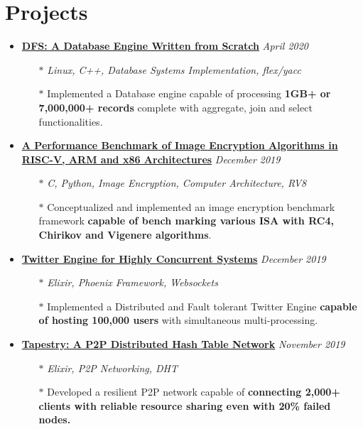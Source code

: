 \documentclass[10pt,a4paper]{article}
\begin{document}
\section{{\faCoffee} Projects}
	\begin{itemize}[noitemsep,nolistsep]

		\item{\textbf{\href{https://github.com/r0ck3r008/database-from-scratch}{DFS: A Database Engine Written from Scratch}} \hfill \textit{April 2020}}
			\begin{itemize}[leftmargin=*]
				\setlength\itemsep{-0.25em}
				\item[$\ast$]{\textit{Linux, C++, Database Systems Implementation, flex/yacc}}
				\item[$\ast$]{Implemented a Database engine capable of processing \textbf{1GB+ or 7,000,000+ records} complete with aggregate, join and select functionalities.}
			\end{itemize}

		\item{\textbf{\href{https://github.com/r0ck3r008/arch-perf-benchmark}{A Performance Benchmark of Image Encryption Algorithms in RISC-V, ARM and x86 Architectures}} \hfill \textit{December 2019}}
			\begin{itemize}[leftmargin=*]
				\setlength\itemsep{-0.25em}
				\item[$\ast$]{\textit{C, Python, Image Encryption, Computer Architecture, RV8}}
				\item[$\ast$]{Conceptualized and implemented an image encryption benchmark framework \textbf{capable of bench marking various ISA with RC4, Chirikov and Vigenere algorithms}.}
			\end{itemize}

		\item{\textbf{\href{https://github.com/r0ck3r008/twitter-engine}{Twitter Engine for Highly Concurrent Systems}} \hfill \textit{December 2019}}
			\begin{itemize}[leftmargin=*]
				\setlength\itemsep{-0.25em}
				\item[$\ast$]{\textit{Elixir, Phoenix Framework, Websockets}}
				\item[$\ast$]{Implemented a Distributed and Fault tolerant Twitter Engine \textbf{capable of hosting 100,000 users} with simultaneous multi-processing.}
			\end{itemize}

		\item{\textbf{\href{https://github.com/r0ck3r008/tapestry\_p2p}{Tapestry: A P2P Distributed Hash Table Network}} \hfill \textit{November 2019}}
			\begin{itemize}[leftmargin=*]
				\setlength\itemsep{-0.25em}
				\item[$\ast$]{\textit{Elixir, P2P Networking, DHT}}
				\item[$\ast$]{Developed a resilient P2P network capable of \textbf{connecting 2,000+ clients with reliable resource sharing even with 20\% failed nodes.}}
			\end{itemize}


\end{itemize}
\end{document}
